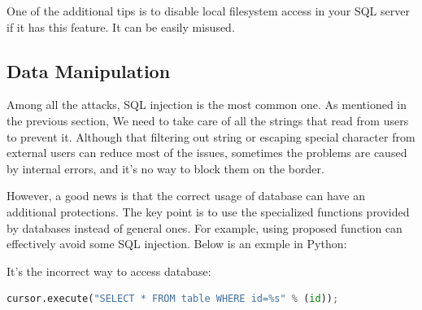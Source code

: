 \documentclass[conference]{IEEEtran}
\begin{document}



One of the additional tips is to
disable local filesystem access in your SQL server if it has this feature.
It can be easily misused.

\subsection{Data Manipulation}
Among all the attacks, SQL injection is the most common one.
As mentioned in the previous section,
We need to take care of all the strings that read from users to prevent it.
Although that filtering out string or escaping special character
from external users can reduce most of the issues, sometimes
the problems are caused by internal errors,
and it's no way to block them on the border.

However, a good news is that the correct usage of database can have an
additional protections.
The key point is to use the specialized functions provided by databases
instead of general ones. For example, using proposed function can effectively
avoid some SQL injection. Below is an exmple in Python:

It's the incorrect way to access database:
\begin{lstlisting}[language=python]
cursor.execute("SELECT * FROM table WHERE id=%s" % (id));
\end{lstlisting}
\end{document}
